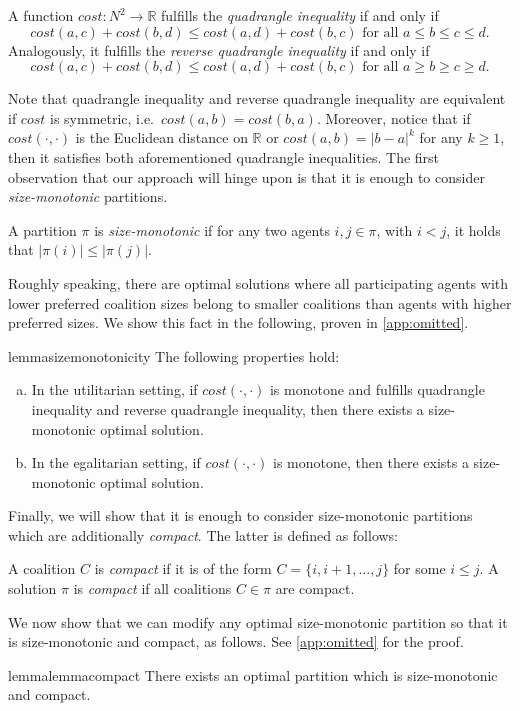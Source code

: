 \documentclass[a4paper]{article}
\newcommand{\cost}{\mathit{cost}}
\begin{document}
\begin{definition}
    A function $\cost: N^2 \rightarrow \mathbb{R}$ fulfills the \emph{quadrangle inequality} if and only if
    \[\cost(a,c) + \cost(b,d) \leq \cost(a,d) + \cost(b,c)\text{ for all } a \leq b \leq c \leq d.\]
    Analogously, it fulfills the \emph{reverse quadrangle inequality} if and only if 
    \[\cost(a,c) + \cost(b,d) \leq \cost(a,d) + \cost(b,c)\text{ for all } a \geq b \geq c \geq d.\]
\end{definition}
Note that quadrangle inequality and reverse quadrangle inequality are equivalent if $\cost$ is symmetric, i.e.\ $\cost(a,b) = \cost(b,a)$. Moreover, notice that if $cost(\cdot,\cdot)$ is the Euclidean distance on $\mathbb{R}$ or $\cost(a,b)=|b-a|^k$ for any $k\geq 1$, then it satisfies both aforementioned quadrangle inequalities.
The first observation that our approach will hinge upon is that it is enough to consider \emph{size-monotonic} partitions. 
\begin{definition}
A partition $\pi$ is \emph{size-monotonic} if for any two agents $i, j \in \pi$, with $i < j$, it holds that $|\pi(i)| \leq |\pi(j)|.$
\end{definition}
Roughly speaking, there are optimal solutions where all participating agents with lower preferred coalition sizes belong to smaller coalitions than agents with higher preferred sizes. We show this fact in the following, proven in \cref{app:omitted}.
\begin{restatable}{lemma}{sizemonotonicity}
\label{lemma:size-monotonic} The following properties hold:
\begin{enumerate}[(a)]
    \item In the utilitarian setting, if $\cost(\cdot,\cdot)$ is monotone and fulfills quadrangle inequality and reverse quadrangle inequality, then there exists a size-monotonic optimal solution.
    \item In the egalitarian setting, if $\cost(\cdot,\cdot)$ is monotone, then there exists a size-monotonic optimal solution.
\end{enumerate}

\end{restatable}
\noindent Finally, we will show that it is enough to consider size-monotonic partitions which are additionally \emph{compact}. The latter is defined as follows:
\begin{definition}[Compactness]
A coalition $C$ is \emph{compact} if it is of the form $C = \{i, i + 1, \ldots, j\}$ for some $i \leq j.$ A solution $\pi$ is \emph{compact} if all coalitions $C \in \pi$ are compact.
\end{definition}
We now show that we can modify any optimal size-monotonic partition so that it is size-monotonic and compact, as follows. See \cref{app:omitted} for the proof. 
\begin{restatable}{lemma}{lemmacompact}\label{lemma:compact} 
There exists an optimal partition which is size-monotonic and compact.
\end{restatable}
\end{document}
